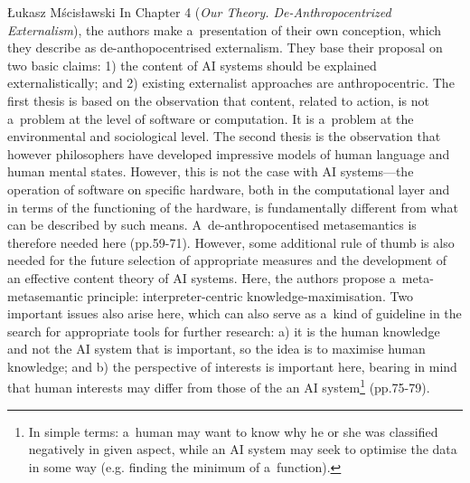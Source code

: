 \begin{newrevengenv}{Łukasz Mścisławski}
In Chapter 4 (\textit{Our Theory. De-Anthropocentrized Externalism}), the authors make a~presentation of their own conception, which they describe as de-anthopocentrised externalism. They base their proposal on two basic claims: 1) the content of AI systems should be explained externalistically; and 2) existing externalist approaches are anthropocentric. The first thesis is based on the observation that content, related to action, is not a~problem at the level of software or computation. It is a~problem at the environmental and sociological level. The second thesis is the observation that however philosophers have developed impressive models of human language and human mental states. However, this is not the case with AI systems---the operation of software on specific hardware, both in the computational layer and in terms of the functioning of the hardware, is fundamentally different from what can be described by such means. A~de-anthropocentised metasemantics is therefore needed here (pp.59-71). However, some additional rule of thumb is also needed for the future selection of appropriate measures and the development of an effective content theory of AI systems. Here, the authors propose a~meta-metasemantic principle: interpreter-centric knowledge-maximisation. Two important issues also arise here, which can also serve as a~kind of guideline in the search for appropriate tools for further research: a) it is the human knowledge and not the AI system that is important, so the idea is to maximise human knowledge; and b) the perspective of interests is important here, bearing in mind that human interests may differ from those of the an AI system\footnote{In simple terms: a~human may want to know why he or she was classified negatively in given aspect, while an AI system may seek to optimise the data in some way (e.g. finding the minimum of a~function).} (pp.75-79).


\end{newrevengenv}
